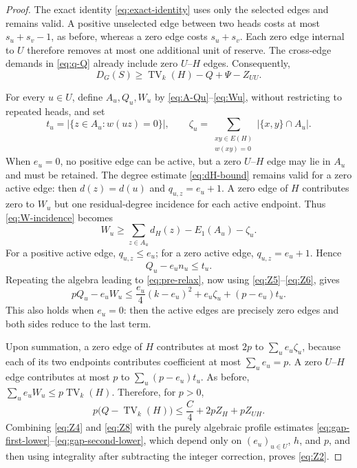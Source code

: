 \documentclass[a4paper,11pt]{amsart}
\numberwithin{equation}{section}
\theoremstyle{definition}
\theoremstyle{remark}
\newcommand{\TV}{\operatorname{TV}}
\begin{document}
\begin{proof}
The exact identity \eqref{eq:exact-identity} uses only the selected edges and remains valid.  A positive unselected edge between two heads costs at most $s_u+s_v-1$, as before, whereas a zero edge costs $s_u+s_v$.  Each zero edge internal to $U$ therefore removes at most one additional unit of reserve.  The cross-edge demands in \eqref{eq:q-Q} already include zero $U$--$H$ edges.  Consequently,
\begin{equation}
D_G(S)\ge\TV_k(H)-Q+\Psi-Z_{UU}.
\label{eq:Z4}
\end{equation}

For every $u\in U$, define $A_u,Q_u,W_u$ by
\eqref{eq:A-Qu}--\eqref{eq:Wu}, without restricting to repeated heads, and set
\begin{equation}
t_u=\bigl\lvert\{z\in A_u:w(uz)=0\}\bigr\rvert,
\qquad
\zeta_u=\sum_{\substack{xy\in E(H)\\w(xy)=0}}
                 \bigl\lvert\{x,y\}\cap A_u\bigr\rvert.
\label{eq:t-zeta}
\end{equation}
When $e_u=0$, no positive edge can be active, but a zero $U$--$H$ edge may lie in $A_u$ and must be retained.
The degree estimate \eqref{eq:dH-bound} remains valid for a zero active edge: then $d(z)=d(u)$ and $q_{u,z}=e_u+1$.  A zero edge of $H$ contributes zero to $W_u$ but one residual-degree incidence for each active endpoint.  Thus \eqref{eq:W-incidence} becomes
\begin{equation}
W_u\ge\sum_{z\in A_u}d_H(z)-E_1(A_u)-\zeta_u.
\label{eq:Z5}
\end{equation}
For a positive active edge, $q_{u,z}\le e_u$; for a zero active edge, $q_{u,z}=e_u+1$.  Hence
\begin{equation}
Q_u-e_un_u\le t_u.
\label{eq:Z6}
\end{equation}
Repeating the algebra leading to \eqref{eq:pre-relax}, now using \eqref{eq:Z5}--\eqref{eq:Z6}, gives
\begin{equation}
pQ_u-e_uW_u
\le\frac{e_u}{4}(k-e_u)^2+e_u\zeta_u+(p-e_u)t_u.
\label{eq:Z7}
\end{equation}
This also holds when $e_u=0$: then the active edges are precisely zero edges and both sides reduce to the last term.

Upon summation, a zero edge of $H$ contributes at most $2p$ to $\sum_ue_u\zeta_u$, because each of its two endpoints contributes coefficient at most $\sum_ue_u=p$.  A zero $U$--$H$ edge contributes at most $p$ to $\sum_u(p-e_u)t_u$.  As before, $\sum_ue_uW_u\le p\TV_k(H)$.  Therefore, for $p>0$,
\begin{equation}
p\bigl(Q-\TV_k(H)\bigr)
\le\frac C4+2pZ_H+pZ_{UH}.
\label{eq:Z8}
\end{equation}
Combining \eqref{eq:Z4} and \eqref{eq:Z8} with the purely algebraic profile estimates \eqref{eq:gap-first-lower}--\eqref{eq:gap-second-lower}, which depend only on $(e_u)_{u\in U}$, $h$, and $p$, and then using integrality after subtracting the integer correction, proves \eqref{eq:Z2}.


\end{proof}
\end{document}

